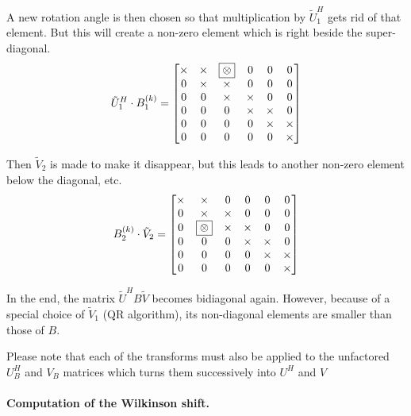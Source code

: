 A new rotation angle is then chosen so that multiplication by
$\tilde{U}_1^H$ gets rid of that element.  But this will create a
non-zero element which is right beside the super-diagonal.
\begin{equation}
\tilde{U}_1^H \cdot B^{(k)}_1 =
\begin{bmatrix}
\times & \times & \framebox{$\otimes$} & 0 & 0 & 0\\
0 & \times & \times & 0 & 0 & 0\\
0 & 0 & \times & \times & 0 & 0\\
0 & 0 & 0 & \times & \times & 0\\
0 & 0 & 0 & 0 & \times & \times\\
0 & 0 & 0 & 0  & 0 & \times\\
\end{bmatrix}
\end{equation}

Then $\tilde{V}_2$ is made to make it disappear, but this leads to
another non-zero element below the diagonal, etc.
\begin{equation}
B^{(k)}_2 \cdot \tilde{V}_2 =
\begin{bmatrix}
\times & \times & 0 & 0 & 0 & 0\\
0 & \times & \times & 0 & 0 & 0\\
0 & \framebox{$\otimes$} & \times & \times & 0 & 0\\
0 & 0 & 0 & \times & \times & 0\\
0 & 0 & 0 & 0 & \times & \times\\
0 & 0 & 0 & 0  & 0 & \times\\
\end{bmatrix}
\end{equation}

In the end, the matrix $\tilde{U}^H B \tilde{V}$ becomes bidiagonal
again.  However, because of a special choice of $\tilde{V}_1$ (QR
algorithm), its non-diagonal elements are smaller than those of $B$.

\addvspace{12pt}

Please note that each of the transforms must also be applied to the
unfactored $U_B^H$ and $V_B$ matrices which turns them successively
into $U^H$ and $V$

\paragraph{Computation of the Wilkinson shift.}

